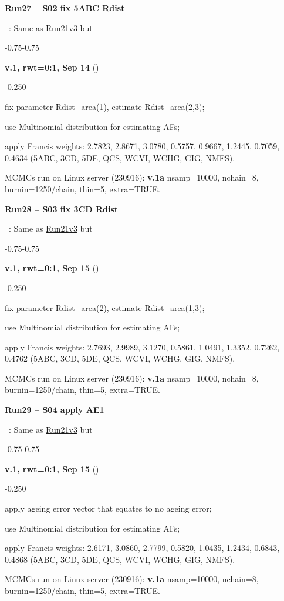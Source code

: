 \hypertarget{R27}{\textbf{Run27 -- S02 fix 5ABC Rdist}}~: Same as \hyperlink{R21}{Run21v3} but
\begin{itemize_csas}{-0.75}{-0.75}
	\item \textbf{v.1, rwt=0:1, Sep 14} ()
	\begin{itemize_csas}{-0.25}{0}
		\item fix parameter  Rdist\_area(1), estimate  Rdist\_area(2,3);
		\item use Multinomial distribution for estimating AFs;
		\item apply Francis weights: 2.7823, 2.8671, 3.0780, 0.5757, 0.9667, 1.2445, 0.7059, 0.4634 (5ABC, 3CD, 5DE, QCS, WCVI, WCHG, GIG, NMFS).
		\item MCMCs run on Linux server (230916): \textbf{v.1a} nsamp=10000, nchain=8, burnin=1250/chain, thin=5, extra=TRUE.
	\end{itemize_csas}
\end{itemize_csas}

\hypertarget{R28}{\textbf{Run28 -- S03 fix 3CD Rdist}}~: Same as \hyperlink{R21}{Run21v3} but
\begin{itemize_csas}{-0.75}{-0.75}
	\item \textbf{v.1, rwt=0:1, Sep 15} ()
	\begin{itemize_csas}{-0.25}{0}
		\item fix parameter  Rdist\_area(2), estimate  Rdist\_area(1,3);
		\item use Multinomial distribution for estimating AFs;
		\item apply Francis weights: 2.7693, 2.9989, 3.1270, 0.5861, 1.0491, 1.3352, 0.7262, 0.4762 (5ABC, 3CD, 5DE, QCS, WCVI, WCHG, GIG, NMFS).
		\item MCMCs run on Linux server (230916): \textbf{v.1a} nsamp=10000, nchain=8, burnin=1250/chain, thin=5, extra=TRUE.
	\end{itemize_csas}
\end{itemize_csas}

\hypertarget{R29}{\textbf{Run29 -- S04 apply AE1}}~: Same as \hyperlink{R21}{Run21v3} but
\begin{itemize_csas}{-0.75}{-0.75}
	\item \textbf{v.1, rwt=0:1, Sep 15} ()
	\begin{itemize_csas}{-0.25}{0}
		\item apply ageing error vector that equates to no ageing error;
		\item use Multinomial distribution for estimating AFs;
		\item apply Francis weights: 2.6171, 3.0860, 2.7799, 0.5820, 1.0435, 1.2434, 0.6843, 0.4868 (5ABC, 3CD, 5DE, QCS, WCVI, WCHG, GIG, NMFS).
		\item MCMCs run on Linux server (230916): \textbf{v.1a} nsamp=10000, nchain=8, burnin=1250/chain, thin=5, extra=TRUE.
	\end{itemize_csas}
\end{itemize_csas}

